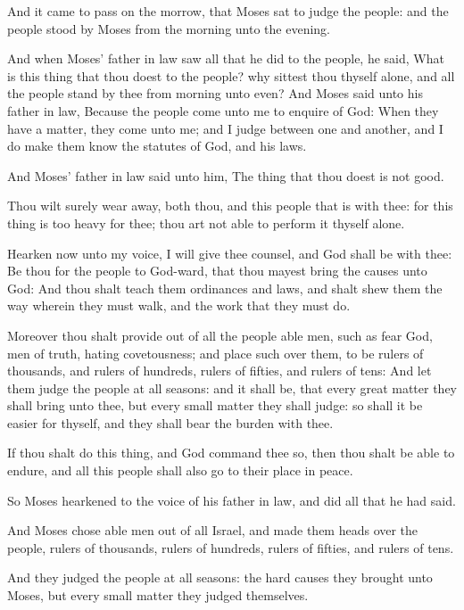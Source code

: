 \Verse And it came to pass on the morrow, that Moses sat to judge the people: and the people stood by Moses from the morning unto the evening.

\Verse And when Moses' father in law saw all that he did to the people, he said, What is this thing that thou doest to the people? why sittest thou thyself alone, and all the people stand by thee from morning unto even?  \Verse And Moses said unto his father in law, Because the people come unto me to enquire of God: \Verse When they have a matter, they come unto me; and I judge between one and another, and I do make them know the statutes of God, and his laws.

\Verse And Moses' father in law said unto him, The thing that thou doest is not good.

\Verse Thou wilt surely wear away, both thou, and this people that is with thee: for this thing is too heavy for thee; thou art not able to perform it thyself alone.

\Verse Hearken now unto my voice, I will give thee counsel, and God shall be with thee: Be thou for the people to God-ward, that thou mayest bring the causes unto God: \Verse And thou shalt teach them ordinances and laws, and shalt shew them the way wherein they must walk, and the work that they must do.

\Verse Moreover thou shalt provide out of all the people able men, such as fear God, men of truth, hating covetousness; and place such over them, to be rulers of thousands, and rulers of hundreds, rulers of fifties, and rulers of tens: \Verse And let them judge the people at all seasons: and it shall be, that every great matter they shall bring unto thee, but every small matter they shall judge: so shall it be easier for thyself, and they shall bear the burden with thee.

\Verse If thou shalt do this thing, and God command thee so, then thou shalt be able to endure, and all this people shall also go to their place in peace.

\Verse So Moses hearkened to the voice of his father in law, and did all that he had said.

\Verse And Moses chose able men out of all Israel, and made them heads over the people, rulers of thousands, rulers of hundreds, rulers of fifties, and rulers of tens.

\Verse And they judged the people at all seasons: the hard causes they brought unto Moses, but every small matter they judged themselves.

